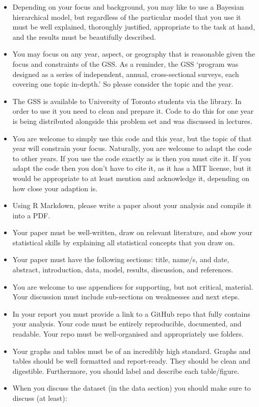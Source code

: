 \documentclass[
]{book}
\providecommand{\tightlist}{%
  \setlength{\itemsep}{0pt}\setlength{\parskip}{0pt}}
\begin{document}
\begin{itemize}
\tightlist
\item
  Depending on your focus and background, you may like to use a Bayesian hierarchical model, but regardless of the particular model that you use it must be well explained, thoroughly justified, appropriate to the task at hand, and the results must be beautifully described.
\item
  You may focus on any year, aspect, or geography that is reasonable given the focus and constraints of the GSS. As a reminder, the GSS `program was designed as a series of independent, annual, cross-sectional surveys, each covering one topic in-depth.' So please consider the topic and the year.
\item
  The GSS is available to University of Toronto students via the library. In order to use it you need to clean and prepare it. Code to do this for one year is being distributed alongside this problem set and was discussed in lectures.
\item
  You are welcome to simply use this code and this year, but the topic of that year will constrain your focus. Naturally, you are welcome to adapt the code to other years. If you use the code exactly as is then you must cite it. If you adapt the code then you don't have to cite it, as it has a MIT license, but it would be appropriate to at least mention and acknowledge it, depending on how close your adaption is.
\item
  Using R Markdown, please write a paper about your analysis and compile it into a PDF.
\item
  Your paper must be well-written, draw on relevant literature, and show your statistical skills by explaining all statistical concepts that you draw on.
\item
  Your paper must have the following sections: title, name/s, and date, abstract, introduction, data, model, results, discussion, and references.
\item
  You are welcome to use appendices for supporting, but not critical, material. Your discussion must include sub-sections on weaknesses and next steps.
\item
  In your report you must provide a link to a GitHub repo that fully contains your analysis. Your code must be entirely reproducible, documented, and readable. Your repo must be well-organised and appropriately use folders.
\item
  Your graphs and tables must be of an incredibly high standard. Graphs and tables should be well formatted and report-ready. They should be clean and digestible. Furthermore, you should label and describe each table/figure.
\item
  When you discuss the dataset (in the data section) you should make sure to discuss (at least):


\end{itemize}
\end{document}
